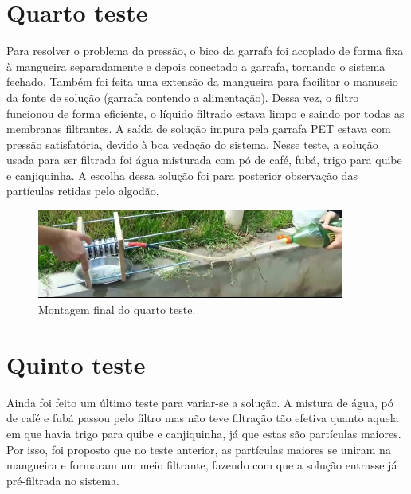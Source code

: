 \section{Quarto teste}\label{sec:quarto_teste}

Para resolver o problema da pressão, o bico da garrafa foi acoplado de forma
fixa à mangueira separadamente e depois conectado a garrafa, tornando o sistema
fechado. Também foi feita uma extensão da mangueira para facilitar o manuseio da
fonte de solução (garrafa contendo a alimentação). Dessa vez, o filtro funcionou
de forma eficiente, o líquido filtrado estava limpo e saindo por todas as
membranas filtrantes. A saída de solução impura pela garrafa PET estava com
pressão satisfatória, devido à boa vedação do sistema. Nesse teste, a solução
usada para ser filtrada foi água misturada com pó de café, fubá, trigo para
quibe e canjiquinha. A escolha dessa solução foi para posterior observação das
partículas retidas pelo algodão.

\begin{figure}[H]
  \centering
  \includegraphics[width=0.9\textwidth]{figuras/quarto_teste.png}
  \caption{Montagem final do quarto teste.\label{fig:quarto_teste}}
\end{figure}


\section{Quinto teste}\label{sec:quinto_teste}

Ainda foi feito um último teste para variar-se a solução. A mistura de água, pó
de café e fubá passou pelo filtro mas não teve filtração tão efetiva quanto
aquela em que havia trigo para quibe e canjiquinha, já que estas são partículas
maiores. Por isso, foi proposto que no teste anterior, as partículas maiores se
uniram na mangueira e formaram um meio filtrante, fazendo com que a solução
entrasse já pré-filtrada no sistema.


